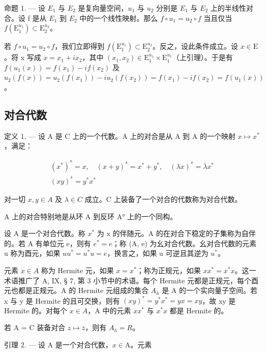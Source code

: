 命题 1. --- 设 \(E_{1}\) 与 \(E_{2}\) 是复向量空间，\(u_{1}\) 与 \(u_{2}\) 分别是 \(E_{1}\) 与 \(E_{2}\) 上的半线性对合。设 f 是从 \(E_{1}\) 到 \(E_{2}\) 中的一个线性映射。那么 \(f \circ u_{1} = u_{2} \circ f\) 当且仅当 \(f(\mathrm{E}_{1}^{u_{1}}) \subset \mathrm{E}_{2}^{u_{2}}\)。

若 \(f \circ u_1 = u_2 \circ f\)，我们立即得到 \(f(\mathrm{E}_1^{u_1}) \subset \mathrm{E}_2^{u_2}\)。反之，设此条件成立。设 \(x \in \mathrm{E}\)。将 x 写成 \(x = x_1 + ix_2\)，其中 \((x_1, x_2) \in \mathrm{E}_1^{u_1} \times \mathrm{E}_1^{u_1}\)（上引理）。于是有 \(f(u_1(x)) = f(x_1) - if(x_2)\) 及 \(u_2(f(x)) = u_2(f(x_1)) - iu_2(f(x_2)) = f(x_1) - if(x_2) = f(u_1(x))\)。

\subsection{对合代数}

定义 1. --- 设 A 是 C 上的一个代数。A 上的对合是从 A 到 A 的一个映射 \(x \mapsto x^{*}\)，满足：

\[
\begin{array}{c} (x ^ {*}) ^ {*} = x, \quad (x + y) ^ {*} = x ^ {*} + y ^ {*}, \quad (\lambda x) ^ {*} = \overline {{\lambda}} x ^ {*} \\ (x y) ^ {*} = y ^ {*} x ^ {*} \end{array}
\]

对一切 \(x, y \in A\) 及 \(\lambda \in C\) 成立。C 上装备了一个对合的代数称为对合代数。

A 上的对合特别地是从环 A 到反环 A° 上的一个同构。

设 A 是一个对合代数。称 \(x^{*}\) 为 x 的伴随元。A 的在对合下稳定的子集称为自伴的。若 A 有单位元 e，则有 \(e^{*} = e\)；称 (A, e) 为幺对合代数。幺对合代数的元素 u 称为酉元，如果 \(uu^{*} = u^{*}u = e\)，换言之，如果 u 可逆且其逆为 \(u^{*}\)。

元素 \(x \in A\) 称为 Hermite 元，如果 \(x = x^{*}\)；称为正规元，如果 \(xx^{*} = x^{*}x\)。这一术语推广了 A, IX, § 7, 第 3 小节中的术语。每个 Hermite 元都是正规元，每个酉元也都是正规元。A 的 Hermite 元组成的集合 \(A_{h}\) 是 A 的一个实向量子空间。若 x 与 y 是 Hermite 的且可交换，则有 \((xy)^{*} = y^{*}x^{*} = yx = xy\)，故 xy 是 Hermite 的。对每个 \(x \in A\)，A 中的元素 \(xx^{*}\) 与 \(x^{*}x\) 都是 Hermite 的。

若 A = C 装备对合 \(z \mapsto \overline{z}\)，则有 \(A_{h} = R\)。

引理 2. --- 设 A 是一个对合代数，\(x \in \mathrm{A}\)。元素

